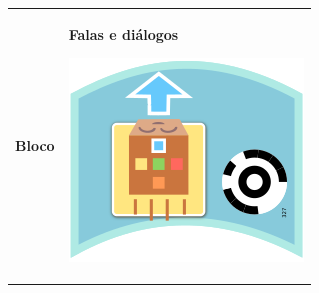 \begin{quadro}[htbp]
    \label{quadro:falas_simbolos}
    \begin{footnotesize}
    \begin{longtable}{ | m{} | m{} |}
        \hline
        \textbf{Bloco}  & \textbf{Falas e diálogos} \hline
        \endhead
        
    
        \includegraphics[width=.9\linewidth]{figs/blocks/frente.png} &
    

\end{longtable}
\end{footnotesize}
\end{quadro}
